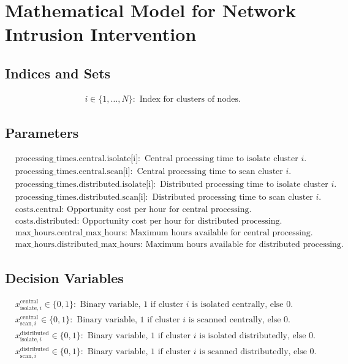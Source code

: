 \documentclass{article}
\begin{document}
\section*{Mathematical Model for Network Intrusion Intervention}

\subsection*{Indices and Sets}
\begin{align*}
    & i \in \{1, \ldots, N\}: \text{ Index for clusters of nodes.}
\end{align*}

\subsection*{Parameters}
\begin{align*}
    & \text{processing\_times.central.isolate[i]}: \text{ Central processing time to isolate cluster } i. \\
    & \text{processing\_times.central.scan[i]}: \text{ Central processing time to scan cluster } i. \\
    & \text{processing\_times.distributed.isolate[i]}: \text{ Distributed processing time to isolate cluster } i. \\
    & \text{processing\_times.distributed.scan[i]}: \text{ Distributed processing time to scan cluster } i. \\
    & \text{costs.central}: \text{ Opportunity cost per hour for central processing.} \\
    & \text{costs.distributed}: \text{ Opportunity cost per hour for distributed processing.} \\
    & \text{max\_hours.central\_max\_hours}: \text{ Maximum hours available for central processing.} \\
    & \text{max\_hours.distributed\_max\_hours}: \text{ Maximum hours available for distributed processing.} 
\end{align*}

\subsection*{Decision Variables}
\begin{align*}
    & x^{\text{central}}_{\text{isolate}, i} \in \{0, 1\}: \text{ Binary variable, 1 if cluster } i \text{ is isolated centrally, else 0.}\\
    & x^{\text{central}}_{\text{scan}, i} \in \{0, 1\}: \text{ Binary variable, 1 if cluster } i \text{ is scanned centrally, else 0.}\\
    & x^{\text{distributed}}_{\text{isolate}, i} \in \{0, 1\}: \text{ Binary variable, 1 if cluster } i \text{ is isolated distributedly, else 0.}\\
    & x^{\text{distributed}}_{\text{scan}, i} \in \{0, 1\}: \text{ Binary variable, 1 if cluster } i \text{ is scanned distributedly, else 0.}
\end{align*}
\end{document}
